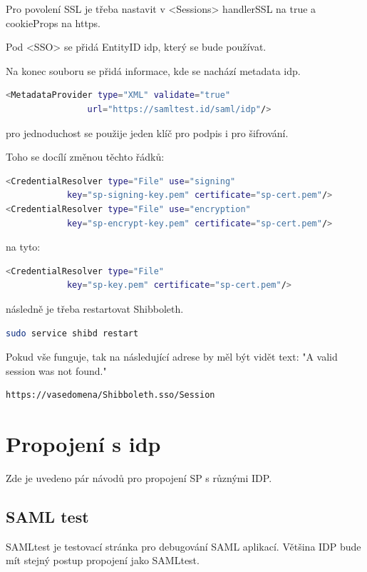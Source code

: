 Pro povolení SSL je třeba nastavit v <Sessions>  handlerSSL na true a cookieProps na https.

Pod <SSO> se přidá EntityID idp, který se bude používat.

Na konec souboru se přidá informace, kde se nachází metadata idp.
\begin{lstlisting}[language=Bash]
 <MetadataProvider type="XML" validate="true"
                url="https://samltest.id/saml/idp"/>
\end{lstlisting}

pro jednoduchost se použije jeden klíč pro podpis i pro šifrování.

Toho se docílí změnou těchto řádků:
\begin{lstlisting}[language=Bash]
<CredentialResolver type="File" use="signing"
            key="sp-signing-key.pem" certificate="sp-cert.pem"/>
<CredentialResolver type="File" use="encryption"
            key="sp-encrypt-key.pem" certificate="sp-cert.pem"/>
\end{lstlisting}

na tyto:
\begin{lstlisting}[language=Bash]
<CredentialResolver type="File"
            key="sp-key.pem" certificate="sp-cert.pem"/>
\end{lstlisting}

následně je třeba restartovat Shibboleth.
\begin{lstlisting}[language=Bash]
sudo service shibd restart
\end{lstlisting}

Pokud vše funguje, tak na následující adrese by měl být vidět text: "A valid session was not found."
\begin{lstlisting}[language=Bash]
https://vasedomena/Shibboleth.sso/Session
\end{lstlisting}

\section{Propojení s idp}

Zde je uvedeno pár návodů pro propojení SP s různými IDP.

\subsection{SAML test}
SAMLtest je testovací stránka pro debugování SAML aplikací. Většina IDP bude mít stejný postup propojení jako SAMLtest.



